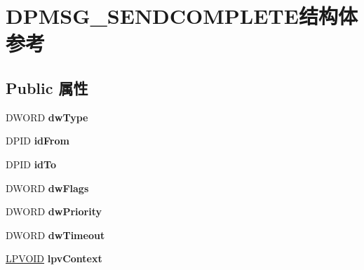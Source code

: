 \hypertarget{struct_d_p_m_s_g___s_e_n_d_c_o_m_p_l_e_t_e}{}\section{D\+P\+M\+S\+G\+\_\+\+S\+E\+N\+D\+C\+O\+M\+P\+L\+E\+T\+E结构体 参考}
\label{struct_d_p_m_s_g___s_e_n_d_c_o_m_p_l_e_t_e}
\subsection*{Public 属性}
\begin{DoxyCompactItemize}
\item 
\mbox{\label{struct_d_p_m_s_g___s_e_n_d_c_o_m_p_l_e_t_e_a1287fdc0c25af4f6a89febc2e97135c1}} 
D\+W\+O\+RD {\bfseries dw\+Type}
\item 
\mbox{\label{struct_d_p_m_s_g___s_e_n_d_c_o_m_p_l_e_t_e_a4bfa0593bd987df7d6af1703b23121ae}} 
D\+P\+ID {\bfseries id\+From}
\item 
\mbox{\label{struct_d_p_m_s_g___s_e_n_d_c_o_m_p_l_e_t_e_a01c63d804334fd97523753a91b1534dd}} 
D\+P\+ID {\bfseries id\+To}
\item 
\mbox{\label{struct_d_p_m_s_g___s_e_n_d_c_o_m_p_l_e_t_e_a3c3478e3e3d234888cd7645ec901261b}} 
D\+W\+O\+RD {\bfseries dw\+Flags}
\item 
\mbox{\label{struct_d_p_m_s_g___s_e_n_d_c_o_m_p_l_e_t_e_aa8490c0384d756420a6e589e319e3903}} 
D\+W\+O\+RD {\bfseries dw\+Priority}
\item 
\mbox{\label{struct_d_p_m_s_g___s_e_n_d_c_o_m_p_l_e_t_e_a17be0b0977aa58471f20f6c70f4bea8e}} 
D\+W\+O\+RD {\bfseries dw\+Timeout}
\item 
\mbox{\label{struct_d_p_m_s_g___s_e_n_d_c_o_m_p_l_e_t_e_a9e7ca996b577a36e9687adb51f7e6ce0}} 
\hyperlink{interfacevoid}{L\+P\+V\+O\+ID} {\bfseries lpv\+Context}
\item 

\end{DoxyCompactItemize}
